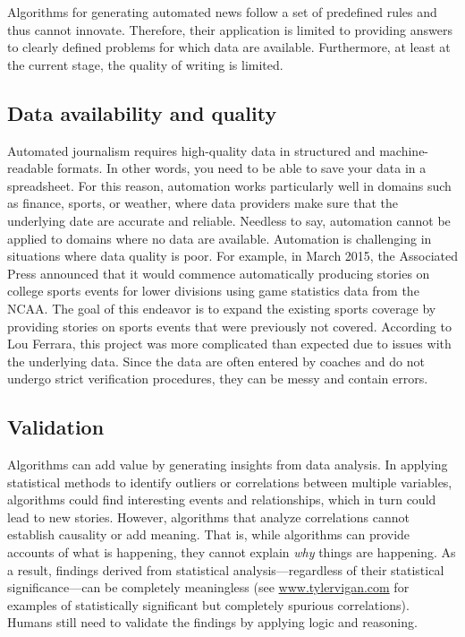 \documentclass[notoc, symmetric, nobib, nols]{towcenter-guideto-book}
\begin{document}
Algorithms for generating automated news follow a set of predefined rules and thus cannot innovate. Therefore, their application is limited to providing answers to clearly defined problems for which data are available. Furthermore, at least at the current stage, the quality of writing is limited.  

\subsection{Data availability and quality}

Automated journalism requires high-quality data in structured and machine-readable formats. In other words, you need to be able to save your data in a spreadsheet. For this reason, automation works particularly well in domains such as finance, sports, or weather, where data providers make sure that the underlying date are accurate and reliable. Needless to say, automation cannot be applied to domains where no data are available. Automation is challenging in situations where data quality is poor. For example, in March 2015, the Associated Press announced that it would commence automatically producing stories on college sports events for lower divisions using game statistics data from the NCAA. The goal of this endeavor is to expand the existing sports coverage by providing stories on sports events that were previously not covered. According to Lou Ferrara, this project was more complicated than expected due to issues with the underlying data. Since the data are often entered by coaches and do not undergo strict verification procedures, they can be messy and contain errors. 

\subsection{Validation}

Algorithms can add value by generating insights from data analysis. In applying statistical methods to identify outliers or correlations between multiple variables, algorithms could find interesting events and relationships, which in turn could lead to new stories. However, algorithms that analyze correlations cannot establish causality or add meaning. That is, while algorithms can provide accounts of what is happening, they cannot explain \textit{why} things are happening.\autocite{lazer14} As a result, findings derived from statistical analysis---regardless of their statistical significance---can be completely meaningless (see \href{www.tylervigan.com}{www.tylervigan.com} for examples of statistically significant but completely spurious correlations). Humans still need to validate the findings by applying logic and reasoning.\autocite{latar15}
\end{document}
